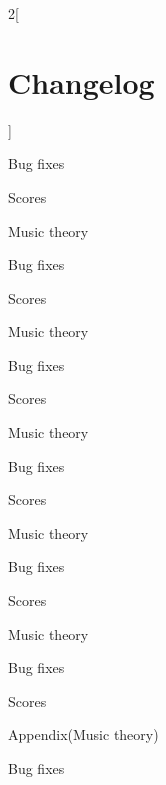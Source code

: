 {\begin{multicols*}{2}[\section*{Changelog}]
\begin{changelog}[author=李小丹, section=false]
\begin{version}[v=2.5-$\beta$(3.141), date=2023-04-08]
	\fixed
		\item Bug fixes
\end{version}
\begin{version}[v=2.4-$\beta$(3.141), date=2023-04-02]
	\added
		\item Scores
		\item Music theory
	\fixed
		\item Bug fixes
\end{version}
\begin{version}[v=2.3-$\beta$(3.141), date=2023-03-25]
	\added
		\item Scores
		\item Music theory
	\fixed
		\item Bug fixes
\end{version}
\begin{version}[v=2.2-$\beta$(3.141), date=2023-03-18]
	\added
		\item Scores
		\item Music theory
	\fixed
		\item Bug fixes
\end{version}
\begin{version}[v=2.1-$\beta$(3.141), date=2023-03-11]
	\added
		\item Scores
		\item Music theory
	\fixed
		\item Bug fixes
\end{version}
\begin{version}[v=2.0-$\beta$(3.141), date=2023-03-04, remark="Upload github"]
	\added
		\item Scores
		\item Music theory
	\fixed
		\item Bug fixes
\end{version}
\begin{version}[v=1.5-$\beta$(3.14), date=2023-02-21]
	\added
		\item Scores
		\item Appendix(Music theory)
	\fixed
		\item Bug fixes
\end{version}

\end{changelog}
\end{multicols*}
\pagebreak[4]
}%
